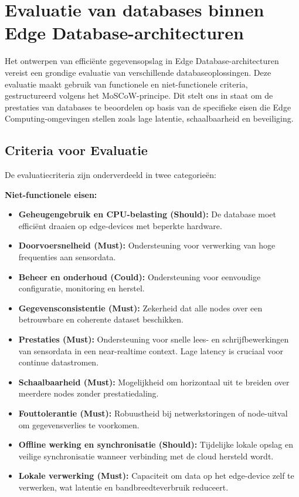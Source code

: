 \newpage

\section{Evaluatie van databases binnen Edge Database-architecturen}

    Het ontwerpen van efficiënte gegevensopslag in Edge Database-architecturen vereist een grondige evaluatie van verschillende databaseoplossingen. Deze evaluatie maakt gebruik van functionele en niet-functionele criteria, gestructureerd volgens het MoSCoW-principe. Dit stelt ons in staat om de prestaties van databases te beoordelen op basis van de specifieke eisen die Edge Computing-omgevingen stellen zoals lage latentie, schaalbaarheid en beveiliging.

    \subsection{Criteria voor Evaluatie}
    De evaluatiecriteria zijn onderverdeeld in twee categorieën:

    \textbf{Niet-functionele eisen:}
    \begin{itemize}
        \item \textbf{Geheugengebruik en CPU-belasting (Should):} De database moet efficiënt draaien op edge-devices met beperkte hardware.
        \item \textbf{Doorvoersnelheid (Must):} Ondersteuning voor verwerking van hoge frequenties aan sensordata.
        \item \textbf{Beheer en onderhoud (Could):} Ondersteuning voor eenvoudige configuratie, monitoring en herstel.
        \item \textbf{Gegevensconsistentie (Must):} Zekerheid dat alle nodes over een betrouwbare en coherente dataset beschikken.
        \item \textbf{Prestaties (Must):} Ondersteuning voor snelle lees- en schrijfbewerkingen van sensordata in een near-realtime context. Lage latency is cruciaal voor continue datastromen.
        \item \textbf{Schaalbaarheid (Must):} Mogelijkheid om horizontaal uit te breiden over meerdere nodes zonder prestatiedaling.
        \item \textbf{Fouttolerantie (Must):} Robuustheid bij netwerkstoringen of node-uitval om gegevensverlies te voorkomen.
        \item \textbf{Offline werking en synchronisatie (Should):} Tijdelijke lokale opslag en veilige synchronisatie wanneer verbinding met de cloud hersteld wordt.
        \item \textbf{Lokale verwerking (Must):} Capaciteit om data op het edge-device zelf te verwerken, wat latentie en bandbreedteverbruik reduceert.
    \end{itemize}

